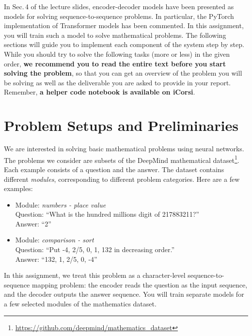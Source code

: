 \documentclass[a4paper,11pt]{article}
\begin{document}
In Sec.\,4 of the lecture slides, encoder-decoder models have been
presented as models for solving sequence-to-sequence problems.
In particular, the PyTorch implementation of Transformer models has been commented.
In this assignment, you will train such a model to solve mathematical problems.
The following sections will guide you to implement each component of the system step by step.
While you should try to solve the following tasks (more or less) in the given order, \textbf{we recommend you to read the entire text before you start solving the problem}, so that you can get an overview of the problem you will be solving as well as the deliverable you are asked to
provide in your report.
Remember, \textbf{a helper code notebook is available on iCorsi}.

\section{Problem Setups and Preliminaries}
We are interested in solving basic mathematical problems using neural networks.
The problems we consider are subsets of the DeepMind mathematical dataset\footnote{\url{https://github.com/deepmind/mathematics_dataset}}.
Each example consists of a question and the answer.
The dataset contains different \textit{modules}, corresponding to different
problem categories. Here are a few examples:
\begin{itemize}
\item Module: \textit{numbers - place value}\\
Question: ``What is the hundred millions digit of 217883211?''\\
Answer: ``2''
\item Module: \textit{comparison - sort}\\
Question: ``Put -4, 2/5, 0, 1, 132 in decreasing order.''\\
Answer: ``132, 1, 2/5, 0, -4''
\end{itemize}

In this assignment, we treat this problem as a character-level sequence-to-sequence mapping problem:
the encoder reads the question as the input sequence, and the decoder outputs the
answer sequence.
You will train separate models for a few selected modules of the mathematics dataset.
\end{document}
